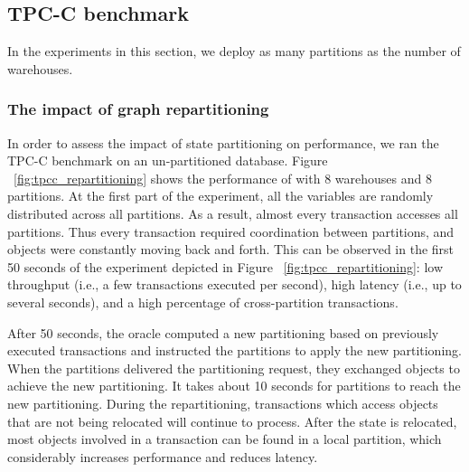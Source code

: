 
\subsection{TPC-C benchmark}
\label{sec:evaluation:tpc-c}

In the experiments in this section, we deploy as many partitions as the number of warehouses.

\subsubsection{The impact of graph repartitioning}
In order to assess the impact of state partitioning on performance, we ran the TPC-C benchmark on an 
un-partitioned database.  Figure ~\ref{fig:tpcc_repartitioning} 
shows the performance of \dynastar with 8 warehouses and 8 partitions.
At the first part of the experiment, all the variables are randomly distributed across all partitions.
As a result, almost every transaction accesses all partitions. Thus every transaction 
required coordination between partitions, and objects were constantly moving back and forth. 
This can be observed in the first 50 seconds of the experiment depicted in Figure 
~\ref{fig:tpcc_repartitioning}: low throughput (i.e., a few transactions executed per second), 
high latency (i.e., up to several seconds), and a high percentage of cross-partition transactions.



After 50 seconds, the oracle computed a new partitioning based on previously executed transactions 
and instructed the partitions to apply the new partitioning.
When the partitions delivered the partitioning request, they exchanged objects to achieve the new partitioning.
It takes about 10 seconds for partitions to reach the new partitioning.
During the repartitioning, transactions which access objects that are not being relocated will continue to process.
After the state is relocated, most objects involved in a transaction
can be found in a local partition, which considerably increases performance and reduces latency. 

